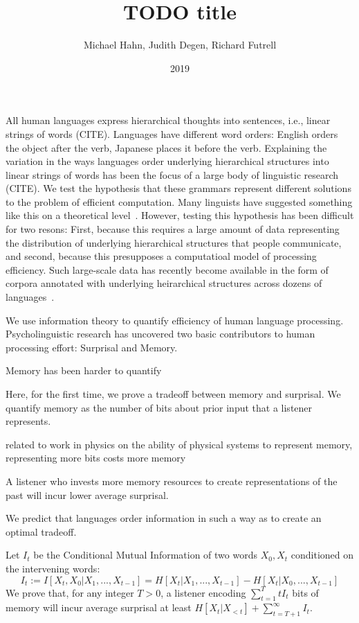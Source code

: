 \documentclass[11pt,letterpaper]{article}
\title{TODO title}
\author{Michael Hahn, Judith Degen, Richard Futrell}
\date{2019}
\begin{document}
\maketitle

All human languages express hierarchical thoughts into sentences, i.e., linear strings of words (CITE).
Languages have different word orders: English orders the object after the verb, Japanese places it before the verb.
Explaining the variation in the ways languages  order underlying hierarchical structures into linear strings of words has been the focus of a large body of linguistic research (CITE).
We test the hypothesis that these grammars represent different solutions to the problem of efficient computation.
Many linguists have suggested something like this on a theoretical level~\citep{chomsky2005three,hauser2002faculty, berwick1984grammatical,hawkins1994performance}.
However, testing this hypothesis has been difficult for two resons:
First, because this requires a large amount of data representing the distribution of underlying hierarchical structures that people communicate,
and
second, because this presupposes a computatioal model of processing efficiency.
Such large-scale data has recently become available in the form of corpora annotated with underlying heirarchical structures across dozens of languages~\citep{nivre-universal-2017}.

We use information theory to quantify efficiency of human language processing.
Psycholinguistic research has uncovered two basic contributors to human processing effort: Surprisal and Memory.



Memory has been harder to quantify

Here, for the first time, we prove a tradeoff between memory and surprisal.
We quantify memory as the number of bits about prior input that a listener represents.

related to work in physics on the ability of physical systems to represent memory, representing more bits costs more memory \citep{PhysRevLett.115.098701}

A listener who invests more memory resources to create representations of the past will incur lower average surprisal.

We predict that languages order information in such a way as to create an optimal tradeoff.

Let $I_t$ be the Conditional Mutual Information of two words $X_0, X_t$ conditioned on the intervening words:
\begin{equation}
	I_t := I[X_t, X_0 | X_1, ..., X_{t-1}] = H[X_t|X_1, ..., X_{t-1}] - H[X_t|X_0, ..., X_{t-1}] 
\end{equation}
We prove that, for any integer $T > 0$, a listener encoding $\sum_{t=1}^T t I_t$ bits of memory will incur average surprisal at least $H[X_t| X_{<t}] + \sum_{t=T+1}^\infty I_t$.
\end{document}
